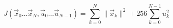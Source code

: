 \documentclass{article}
\begin{document}
\thispagestyle{empty}
$$
J(\vec{x}_0\dots\vec{x}_N,\vec{u}_0\dots\vec{u}_{N-1}) = \sum\limits_{k=0}^{N} \|\vec{x}_k\|^2 + 256 \sum\limits_{k=0}^{N-1} u_k^2
$$
\end{document}
